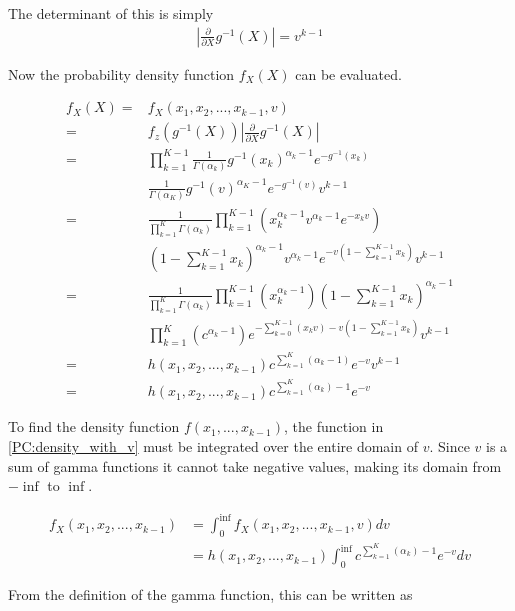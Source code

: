 \documentclass{article}
\begin{document}
The determinant of this is simply
\begin{align}
    \left| \frac{\partial}{\partial X} g^{-1}(X) \right| = v^{k-1} \label{PC:det_of_jacobian}
\end{align}

Now the probability density function $f_X(X)$ can be evaluated. 

\begin{align}
    f_X(X) ={}&  f_X(x_1, x_2, ..., x_{k-1}, v) \label{PC:density_with_v}\\
    ={}& f_z(g^{-1}(X)) \left| \frac{\partial}{\partial X} g^{-1}(X) \right|\\
    ={}& \prod_{k=1}^{K-1} \frac{1}{\Gamma(\alpha_k)} g^{-1}(x_k)^{\alpha_k -1} e^{-g^{-1}(x_k)} \\
    {}& \frac{1}{\Gamma(\alpha_K)} g^{-1}(v)^{\alpha_K -1} e^{-g^{-1}(v)} v^{k-1}\\
    ={}& \frac{1}{\prod_{k=1}^K \Gamma(\alpha_k)} \prod_{k=1}^{K-1} \left( x_k^{\alpha_k-1} v^{\alpha_k-1} e^{-x_k v} \right)\\
    {}& \left( 1 - \sum_{k=1}^{K-1} x_k \right)^{\alpha_k-1} v^{\alpha_k-1} e^{-v \left( 1 - \sum_{k=1}^{K-1} x_k \right)}  v^{k-1}\\
    ={}& \frac{1}{\prod_{k=1}^K \Gamma(\alpha_k)} \prod_{k=1}^{K-1} \left( x_k^{\alpha_k-1} \right) \left( 1 - \sum_{k=1}^{K-1} x_k \right)^{\alpha_k-1} \\
    {}& \prod_{k=1}^{K} \left( c^{\alpha_k-1}\right) e^{-\sum_{k=0}^{K-1} (x_k v) - v \left( 1 - \sum_{k=1}^{K-1} x_k \right) }  v^{k-1}\\
    ={}& h(x_1,x_2,...,x_{k-1}) c^{\sum_{k=1}^{K}(\alpha_k-1)} e^{-v }  v^{k-1} \\
    ={}&h(x_1,x_2,...,x_{k-1}) c^{\sum_{k=1}^{K}(\alpha_k)-1} e^{-v}
\end{align}

To find the density function $f(x_1,...,x_{k-1})$, the function in \ref{PC:density_with_v} must be integrated over the entire domain of $v$. Since $v$ is a sum of gamma functions it cannot take negative values, making its domain from $-\inf$ to $\inf$.

\begin{align}
    f_X(x_1, x_2, ..., x_{k-1}) &= \int_{0}^{\inf} f_X(x_1, x_2, ..., x_{k-1},v) dv\\
    &= h(x_1,x_2,...,x_{k-1}) \int_{0}^{\inf} c^{\sum_{k=1}^{K}(\alpha_k)-1} e^{-v} dv
\end{align}

From the definition of the gamma function, this can be written as
\end{document}
